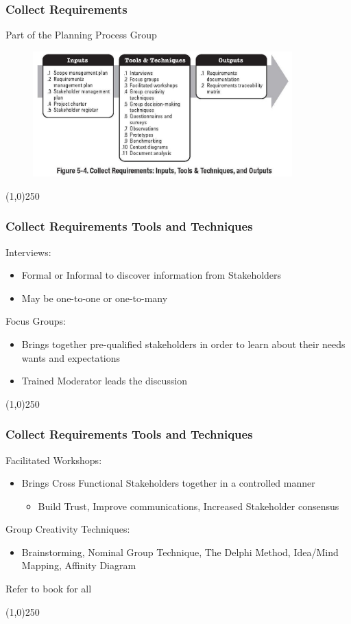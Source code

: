 \begin{frame}
\frametitle{Collect Requirements}{Part of the Planning Process Group}
\begin{figure}
	\centering
		\includegraphics[width = 10cm]{images/Fig5-4.jpg}
	\label{fig:5-4}
\end{figure}
\end{frame}\begin{center}\line(1,0){250}\end{center}



\begin{frame}
\frametitle{Collect Requirements \hfill Tools and Techniques}
Interviews:
\begin{itemize}
	\item Formal or Informal to discover information from Stakeholders
	\item May be one-to-one or one-to-many
\end{itemize}
Focus Groups:
\begin{itemize}
	\item Brings together pre-qualified stakeholders in order to learn about their needs wants and expectations
	\item Trained Moderator leads the discussion
\end{itemize}
\end{frame}\begin{center}\line(1,0){250}\end{center}



\begin{frame}
\frametitle{Collect Requirements \hfill Tools and Techniques}
Facilitated Workshops:
\begin{itemize}
	\item Brings Cross Functional Stakeholders together in a controlled manner
	\begin{itemize}
		\item Build Trust, Improve communications, Increased Stakeholder consensus
	\end{itemize}
\end{itemize}
Group Creativity Techniques:
\begin{itemize}
	\item Brainstorming, Nominal Group Technique, The Delphi Method, Idea/Mind Mapping, Affinity Diagram
\end{itemize}
Refer to book for all
\end{frame}\begin{center}\line(1,0){250}\end{center}



